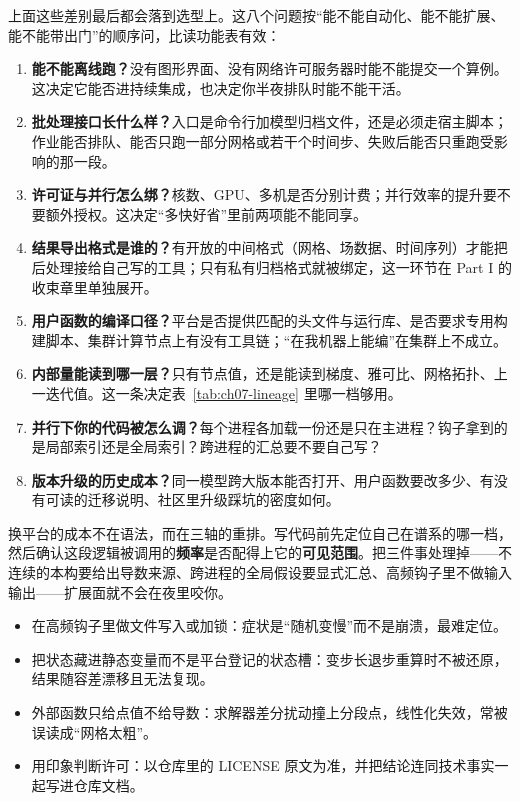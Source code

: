 \documentclass[12pt,a4paper,fontset=fandol]{ctexbook}
\begin{document}
上面这些差别最后都会落到选型上。这八个问题按``能不能自动化、能不能扩展、能不能带出门''的顺序问，比读功能表有效：

\begin{enumerate}
\item \textbf{能不能离线跑？}没有图形界面、没有网络许可服务器时能不能提交一个算例。这决定它能否进持续集成，也决定你半夜排队时能不能干活。
\item \textbf{批处理接口长什么样？}入口是命令行加模型归档文件，还是必须走宿主脚本；作业能否排队、能否只跑一部分网格或若干个时间步、失败后能否只重跑受影响的那一段。
\item \textbf{许可证与并行怎么绑？}核数、GPU、多机是否分别计费；并行效率的提升要不要额外授权。这决定``多快好省''里前两项能不能同享。
\item \textbf{结果导出格式是谁的？}有开放的中间格式（网格、场数据、时间序列）才能把后处理接给自己写的工具；只有私有归档格式就被绑定，这一环节在 Part I 的收束章里单独展开。
\item \textbf{用户函数的编译口径？}平台是否提供匹配的头文件与运行库、是否要求专用构建脚本、集群计算节点上有没有工具链；``在我机器上能编''在集群上不成立。
\item \textbf{内部量能读到哪一层？}只有节点值，还是能读到梯度、雅可比、网格拓扑、上一迭代值。这一条决定表~\ref{tab:ch07-lineage} 里哪一档够用。
\item \textbf{并行下你的代码被怎么调？}每个进程各加载一份还是只在主进程？钩子拿到的是局部索引还是全局索引？跨进程的汇总要不要自己写？
\item \textbf{版本升级的历史成本？}同一模型跨大版本能否打开、用户函数要改多少、有没有可读的迁移说明、社区里升级踩坑的密度如何。
\end{enumerate}

\begin{guideline}[title={本章要点：先定三轴，再查参数表}]
换平台的成本不在语法，而在三轴的重排。写代码前先定位自己在谱系的哪一档，然后确认这段逻辑被调用的\textbf{频率}是否配得上它的\textbf{可见范围}。把三件事处理掉——不连续的本构要给出导数来源、跨进程的全局假设要显式汇总、高频钩子里不做输入输出——扩展面就不会在夜里咬你。
\end{guideline}

\begin{warning}[title={这一章的四个典型陷阱}]
\begin{itemize}
\item 在高频钩子里做文件写入或加锁：症状是``随机变慢''而不是崩溃，最难定位。
\item 把状态藏进静态变量而不是平台登记的状态槽：变步长退步重算时不被还原，结果随容差漂移且无法复现。
\item 外部函数只给点值不给导数：求解器差分扰动撞上分段点，线性化失效，常被误读成``网格太粗''。
\item 用印象判断许可：以仓库里的 LICENSE 原文为准，并把结论连同技术事实一起写进仓库文档。
\end{itemize}
\end{warning}
\end{document}
